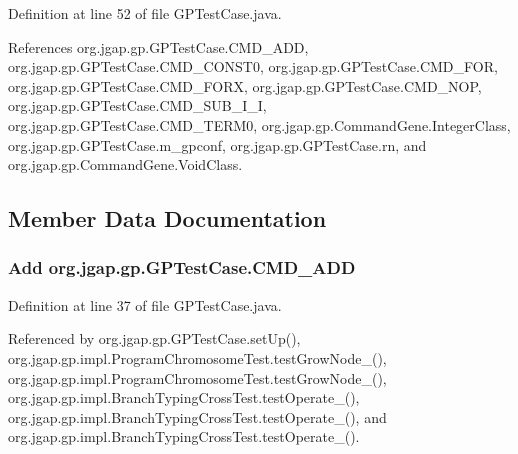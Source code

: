Definition at line 52 of file G\-P\-Test\-Case.\-java.



References org.\-jgap.\-gp.\-G\-P\-Test\-Case.\-C\-M\-D\-\_\-\-A\-D\-D, org.\-jgap.\-gp.\-G\-P\-Test\-Case.\-C\-M\-D\-\_\-\-C\-O\-N\-S\-T0, org.\-jgap.\-gp.\-G\-P\-Test\-Case.\-C\-M\-D\-\_\-\-F\-O\-R, org.\-jgap.\-gp.\-G\-P\-Test\-Case.\-C\-M\-D\-\_\-\-F\-O\-R\-X, org.\-jgap.\-gp.\-G\-P\-Test\-Case.\-C\-M\-D\-\_\-\-N\-O\-P, org.\-jgap.\-gp.\-G\-P\-Test\-Case.\-C\-M\-D\-\_\-\-S\-U\-B\-\_\-\-I\-\_\-\-I, org.\-jgap.\-gp.\-G\-P\-Test\-Case.\-C\-M\-D\-\_\-\-T\-E\-R\-M0, org.\-jgap.\-gp.\-Command\-Gene.\-Integer\-Class, org.\-jgap.\-gp.\-G\-P\-Test\-Case.\-m\-\_\-gpconf, org.\-jgap.\-gp.\-G\-P\-Test\-Case.\-rn, and org.\-jgap.\-gp.\-Command\-Gene.\-Void\-Class.



\subsection{Member Data Documentation}
\hypertarget{classorg_1_1jgap_1_1gp_1_1_g_p_test_case_a412e7c4b66ec6bd20169302767e0eeac}{
\subsubsection[{C\-M\-D\-\_\-\-A\-D\-D}]{\setlength{\rightskip}{0pt plus 5cm}Add org.\-jgap.\-gp.\-G\-P\-Test\-Case.\-C\-M\-D\-\_\-\-A\-D\-D\hspace{0.3cm}{\ttfamily [protected]}}}\label{classorg_1_1jgap_1_1gp_1_1_g_p_test_case_a412e7c4b66ec6bd20169302767e0eeac}


Definition at line 37 of file G\-P\-Test\-Case.\-java.



Referenced by org.\-jgap.\-gp.\-G\-P\-Test\-Case.\-set\-Up(), org.\-jgap.\-gp.\-impl.\-Program\-Chromosome\-Test.\-test\-Grow\-Node\-\_(), org.\-jgap.\-gp.\-impl.\-Program\-Chromosome\-Test.\-test\-Grow\-Node\-\_(), org.\-jgap.\-gp.\-impl.\-Branch\-Typing\-Cross\-Test.\-test\-Operate\-\_(), org.\-jgap.\-gp.\-impl.\-Branch\-Typing\-Cross\-Test.\-test\-Operate\-\_(), and org.\-jgap.\-gp.\-impl.\-Branch\-Typing\-Cross\-Test.\-test\-Operate\-\_().

